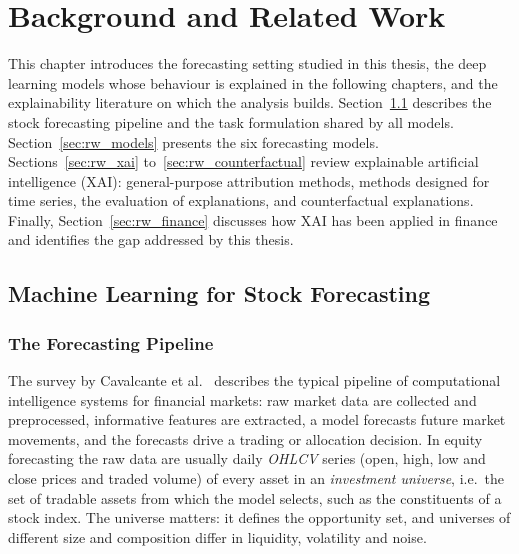 
\chapter{Background and Related Work}
\label{ch:related_work}

This chapter introduces the forecasting setting studied in this thesis, the deep learning models whose behaviour is explained in the following chapters, and the explainability literature on which the analysis builds. Section~\ref{sec:rw_forecasting} describes the stock forecasting pipeline and the task formulation shared by all models. Section~\ref{sec:rw_models} presents the six forecasting models. Sections~\ref{sec:rw_xai} to~\ref{sec:rw_counterfactual} review explainable artificial intelligence (XAI): general-purpose attribution methods, methods designed for time series, the evaluation of explanations, and counterfactual explanations. Finally, Section~\ref{sec:rw_finance} discusses how XAI has been applied in finance and identifies the gap addressed by this thesis.

\section{Machine Learning for Stock Forecasting}
\label{sec:rw_forecasting}

\subsection{The Forecasting Pipeline}

The survey by Cavalcante et al.~\cite{cavalcante2016computational} describes the typical pipeline of computational intelligence systems for financial markets: raw market data are collected and preprocessed, informative features are extracted, a model forecasts future market movements, and the forecasts drive a trading or allocation decision. In equity forecasting the raw data are usually daily \emph{OHLCV} series (open, high, low and close prices and traded volume) of every asset in an \emph{investment universe}, i.e.\ the set of tradable assets from which the model selects, such as the constituents of a stock index. The universe matters: it defines the opportunity set, and universes of different size and composition differ in liquidity, volatility and noise.

